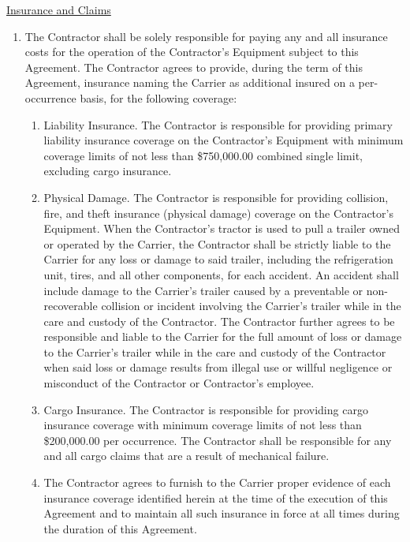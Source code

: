 \underline{Insurance and Claims}
\begin{enumerate}[
    ref = \SecondLevelEnumerator
]
    \item The Contractor shall be solely responsible for paying any and all
    insurance costs for the operation of the Contractor's Equipment subject
    to this Agreement. The Contractor agrees to provide, during the term of
    this Agreement, insurance naming the Carrier as additional insured on a
    per-occurrence basis, for the following coverage:
    \begin{enumerate}[
        ref = \ThirdLevelEnumerator
    ]
        \item Liability Insurance. The Contractor is responsible for
        providing primary liability insurance coverage on the Contractor's
        Equipment with minimum coverage limits of not less than
        \$750,000.00 combined single limit, excluding cargo insurance.

        \item Physical Damage. The Contractor is responsible for providing
        collision, fire, and theft insurance (physical damage) coverage on
        the Contractor's Equipment. When the Contractor's tractor is used
        to pull a trailer owned or operated by the Carrier, the Contractor
        shall be strictly liable to the Carrier for any loss or damage to
        said trailer, including the refrigeration unit, tires, and all
        other components, for each accident. An accident shall include
        damage to the Carrier's trailer caused by a preventable or non-
        recoverable collision or incident involving the Carrier's trailer
        while in the care and custody of the Contractor. The Contractor
        further agrees to be responsible and liable to the Carrier for the
        full amount of loss or damage to the Carrier's trailer while in the
        care and custody of the Contractor when said loss or damage results
        from illegal use or willful negligence or misconduct of the
        Contractor or Contractor's employee.

        \item Cargo Insurance. The Contractor is responsible for providing
        cargo insurance coverage with minimum coverage limits of not less
        than \$200,000.00 per occurrence. The Contractor shall be
        responsible for any and all cargo claims that are a result of
        mechanical failure.

        \item The Contractor agrees to furnish to the Carrier proper
        evidence of each insurance coverage identified herein at the time
        of the execution of this Agreement and to maintain all such
        insurance in force at all times during the duration of this
        Agreement.


\end{enumerate}
\end{enumerate}
